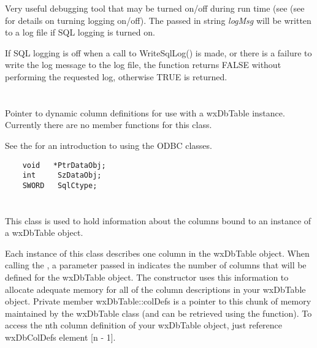 
Very useful debugging tool that may be turned on/off during run time (see
(see  for details on
turning logging on/off).  The passed in string {\it logMsg} will be written to
a log file if SQL logging is turned on.


If SQL logging is off when a call to WriteSqlLog() is made, or there is a
failure to write the log message to the log file, the function returns
FALSE without performing the requested log, otherwise TRUE is returned.



\section{}\label{wxdbcoldataptr}

Pointer to dynamic column definitions for use with a wxDbTable instance.
Currently there are no member functions for this class.

See the  for
an introduction to using the ODBC classes.

\begin{verbatim}
    void   *PtrDataObj;
    int     SzDataObj;
    SWORD   SqlCtype;
\end{verbatim}

\section{}\label{wxdbcoldef}

This class is used to hold information about the columns bound to an
instance of a wxDbTable object.

Each instance of this class describes one column in the wxDbTable
object.  When calling the , a
parameter passed in indicates the number of columns that will be defined for
the wxDbTable object.  The constructor uses this information to allocate
adequate memory for all of the column descriptions in your wxDbTable object.
Private member wxDbTable::colDefs is a pointer to this chunk of memory
maintained by the wxDbTable class (and can be retrieved using the
 function).
To access the nth column definition of your wxDbTable object, just reference
wxDbColDefs element [n - 1].

